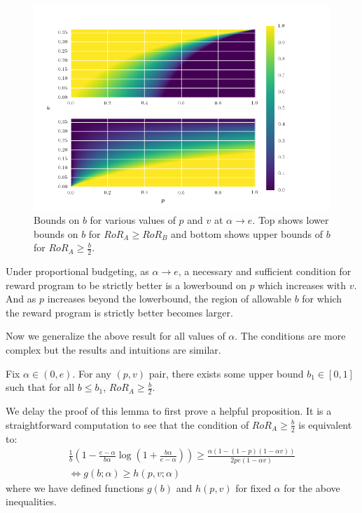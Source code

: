 \begin{figure}[h!]
\begin{centering}
\includegraphics[scale = 0.55]{./figures/b_bounds.png}
\caption{Bounds on $b$ for various values of $p$ and $v$ at $\alpha \rightarrow e$. Top shows lower bounds on $b$ for $RoR_A \geq RoR_B$ and bottom shows upper bounds of $b$ for $RoR_A \geq \frac{b}{2}$.}
\label{fig:b_restrictions}
\end{centering}
\end{figure}

\begin{theorem}
Under proportional budgeting, as $\alpha\rightarrow e$, a necessary and sufficient condition for reward program to be strictly better is a lowerbound on $p$ which increases with $v$.  
And as $p$ increases beyond the lowerbound, the region of allowable $b$ for which the reward program is strictly better becomes larger. 
\end{theorem}

Now we generalize the above result for all values of $\alpha$. The conditions are more complex but the results and intuitions are similar. 

\begin{lemma}
Fix $\alpha \in (0, e)$. For any $(p,v)$ pair, there exists some upper bound $b_1 \in [0,1]$ such that for all $b \leq b_1$, $RoR_A \geq \frac{b}{2}$.
\end{lemma}

\proof
We delay the proof of this lemma to first prove a helpful proposition. It is a straightforward computation to see that the condition of $RoR_A \geq \frac{b}{2}$ is equivalent to:
\begin{gather*}
\frac{1}{b}\left(1-\frac{e-\alpha}{b\alpha}\log \left(1+\frac{b\alpha}{e-\alpha} \right) \right) \geq \frac{\alpha(1-(1-p)(1-\alpha v))}{2pe(1-\alpha v)} \\
\iff
g(b; \alpha) \geq h(p, v; \alpha)
\end{gather*}
where we have defined functions $g(b)$ and $h(p,v)$ for fixed $\alpha$ for the above inequalities. 

